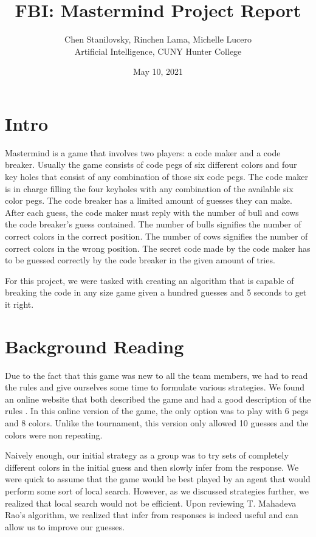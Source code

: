 \documentclass[11pt]{article}
\title{\vspace{-3cm}FBI: Mastermind Project Report}
\author{Chen Stanilovsky, Rinchen Lama, Michelle Lucero\\Artificial Intelligence, CUNY Hunter College}
\date{May 10, 2021}
\begin{document}
\maketitle
    \section{Intro}
    
    Mastermind is a game that involves two players: a code maker and a code breaker. Usually the game consists of code pegs of six different colors and four key holes that consist of any combination of those six code pegs. The code maker is in charge filling the four keyholes with any combination of the available six color pegs. The code breaker has a limited amount of guesses they can make. After each guess, the code maker must reply with the number of bull and cows the code breaker’s guess contained. The number of bulls signifies the number of correct colors in the correct position. The number of cows signifies the number of correct colors in the wrong position. The secret code made by the code maker has to be guessed correctly by the code breaker in the given amount of tries.
    
    For this project, we were tasked with creating an algorithm that is capable of breaking the code in any size game given a hundred guesses and 5 seconds to get it right.
    
    \section{Background Reading}

    Due to the fact that this game was new to all the team members, we had to read the rules and give ourselves some time to formulate various strategies. We found an online website that both described the game and had a good description of the rules \autocite{rules}. In this online version of the game, the only option was to play with 6 pegs and 8 colors. Unlike the tournament, this version only allowed 10 guesses and the colors were non repeating. 
    
    Naively enough, our initial strategy as a group was to try sets of completely different colors in the initial guess and then slowly infer from the response. We were quick to assume that the game would be best played by an agent that would perform some sort of local search. However, as we discussed strategies further, we realized that local search would not be efficient. Upon reviewing T. Mahadeva Rao's algorithm\autocite{rao}, we realized that infer from responses is indeed useful and can allow us to improve our guesses.
\end{document}
